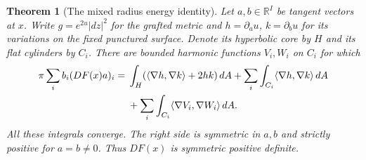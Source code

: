 \documentclass[11pt,a4paper]{article}
\newtheorem{theorem}{Theorem}[section]
\theoremstyle{definition}
\newcommand{\R}{\mathbb R}
\begin{document}
\begin{theorem}[The mixed radius energy identity]\label{thm:radius-energy}
Let $a,b\in\R^I$ be tangent vectors at $x$. Write $g=e^{2u}|dz|^2$ for the grafted metric and $h=\partial_a u$, $k=\partial_b u$ for its variations on the fixed punctured surface. Denote its hyperbolic core by $H$ and its flat cylinders by $C_i$. There are bounded harmonic functions $V_i,W_i$ on $C_i$ for which
\begin{align}
 \pi\sum_i b_i(DF(x)a)_i
 ={}&\int_H(\langle\nabla h,\nabla k\rangle+2hk)\,dA
       +\sum_i\int_{C_i}\langle\nabla h,\nabla k\rangle\,dA\notag\\
 &+\sum_i\int_{C_i}\langle\nabla V_i,\nabla W_i\rangle\,dA.
 \label{eq:mixed-radius-energy}
\end{align}
All these integrals converge. The right side is symmetric in $a,b$ and strictly positive for $a=b\ne0$. Thus $DF(x)$ is symmetric positive definite.
\end{theorem}
\end{document}
